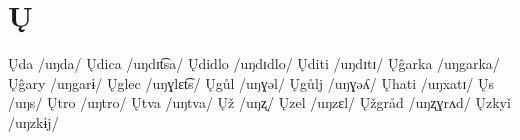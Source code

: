 \chapter{Ų}

Ųda /uŋda/ 
Ųdica /uŋdɪt͡sa/ 
Ųdidlo /uŋdɪdlo/ 
Ųditi /uŋdɪtɪ/ 
Ųĝarka /uŋgarka/ 
Ųĝary /uŋgarɨ/ 
Ųglec /uŋɣlɛt͡s/ 
Ųgůl /uŋɣəl/ 
Ųgůlj /uŋɣəʎ/ 
Ųhati /uŋxatɪ/ 
Ųs /uŋs/ 
Ųtro /uŋtro/ 
Ųtva /uŋtva/ 
Ųž /uŋʐ/ 
Ųzel /uŋzɛl/ 
Ųžgråd /uŋʐɣrʌd/ 
Ųzkyǐ /uŋzkɨj/